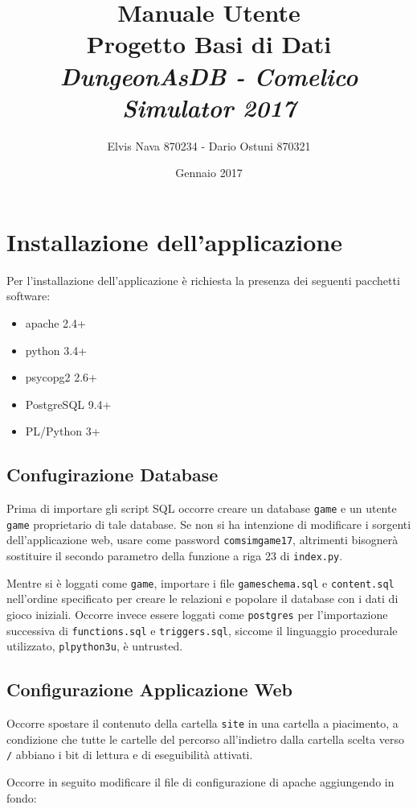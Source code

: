 \documentclass[10pt,a4paper]{article}
\author{Elvis Nava 870234 - Dario Ostuni 870321}
\title{Manuale Utente\\
 Progetto Basi di Dati\\
\textit{DungeonAsDB - Comelico Simulator 2017}}
\date{Gennaio 2017}
\begin{document}
\maketitle

\section{Installazione dell'applicazione}
Per l'installazione dell'applicazione è richiesta la presenza dei seguenti pacchetti software:
\begin{itemize}
\item apache 2.4+
\item python 3.4+
\item psycopg2 2.6+
\item PostgreSQL 9.4+
\item PL/Python 3+
\end{itemize}

\subsection{Confugirazione Database}
Prima di importare gli script SQL occorre creare un database \texttt{game} e un utente \texttt{game} proprietario di tale database. Se non si ha intenzione di modificare i sorgenti dell'applicazione web, usare come password \texttt{comsimgame17}, altrimenti bisognerà sostituire il secondo parametro della funzione a riga 23 di \texttt{index.py}.

Mentre si è loggati come \texttt{game}, importare i file \texttt{gameschema.sql} e \texttt{content.sql} nell'ordine specificato per creare le relazioni e popolare il database con i dati di gioco iniziali. Occorre invece essere loggati come \texttt{postgres} per l'importazione successiva di \texttt{functions.sql} e \texttt{triggers.sql}, siccome il linguaggio procedurale utilizzato, \texttt{plpython3u}, è untrusted.

\subsection{Configurazione Applicazione Web}
Occorre spostare il contenuto della cartella \texttt{site} in una cartella a piacimento, a condizione che tutte le cartelle del percorso all'indietro dalla cartella scelta verso \texttt{/} abbiano i bit di lettura e di eseguibilità attivati.

Occorre in seguito modificare il file di configurazione di apache aggiungendo in fondo:
\end{document}
